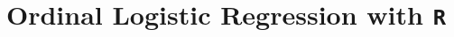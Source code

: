 \documentclass[00-GLMregression.tex]{subfiles}
\begin{document}
\newpage
\Large

\section{Ordinal Logistic Regression with \texttt{R}}
\begin{framed}		
\begin{verbatim}



\end{verbatim}	
\end{framed}
	

\end{document}
